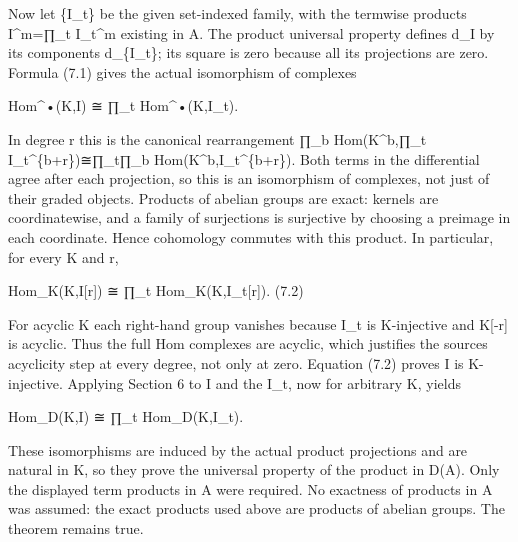 Now let \{I\_\allowbreak{}t\} be the given set-indexed family,\allowbreak{} with the termwise products I\textasciicircum{}m\allowbreak{}=∏\_\allowbreak{}t I\_\allowbreak{}t\textasciicircum{}m existing in A. The product universal property defines d\_\allowbreak{}I by its components d\_\allowbreak{}\{I\_\allowbreak{}t\}; its square is zero because all its projections are zero. Formula (7.1)\allowbreak{} gives the actual isomorphism of complexes

Hom\textasciicircum{}•(K,\allowbreak{}I)\allowbreak{} ≅ ∏\_\allowbreak{}t Hom\textasciicircum{}•(K,\allowbreak{}I\_\allowbreak{}t)\allowbreak{}.

In degree r this is the canonical rearrangement ∏\_\allowbreak{}b Hom(K\textasciicircum{}b,\allowbreak{}∏\_\allowbreak{}t I\_\allowbreak{}t\textasciicircum{}\{b\allowbreak{}+r\})\allowbreak{}≅∏\_\allowbreak{}t∏\_\allowbreak{}b Hom(K\textasciicircum{}b,\allowbreak{}I\_\allowbreak{}t\textasciicircum{}\{b\allowbreak{}+r\})\allowbreak{}. Both terms in the differential agree after each projection,\allowbreak{} so this is an isomorphism of complexes,\allowbreak{} not just of their graded objects. Products of abelian groups are exact:\allowbreak{} kernels are coordinatewise,\allowbreak{} and a family of surjections is surjective by choosing a preimage in each coordinate. Hence cohomology commutes with this product. In particular,\allowbreak{} for every K and r,\allowbreak{}

Hom\_\allowbreak{}K(K,\allowbreak{}I[r]\allowbreak{})\allowbreak{} ≅ ∏\_\allowbreak{}t Hom\_\allowbreak{}K(K,\allowbreak{}I\_\allowbreak{}t[r]\allowbreak{})\allowbreak{}. (7.2)\allowbreak{}

For acyclic K each right-hand group vanishes because I\_\allowbreak{}t is K-injective and K[-r]\allowbreak{} is acyclic. Thus the full Hom complexes are acyclic,\allowbreak{} which justifies the source\textquotesingle s acyclicity step at every degree,\allowbreak{} not only at zero. Equation (7.2)\allowbreak{} proves I is K-injective. Applying Section 6 to I and the I\_\allowbreak{}t,\allowbreak{} now for arbitrary K,\allowbreak{} yields

Hom\_\allowbreak{}D(K,\allowbreak{}I)\allowbreak{} ≅ ∏\_\allowbreak{}t Hom\_\allowbreak{}D(K,\allowbreak{}I\_\allowbreak{}t)\allowbreak{}.

These isomorphisms are induced by the actual product projections and are natural in K,\allowbreak{} so they prove the universal property of the product in D(A)\allowbreak{}. Only the displayed term products in A were required. No exactness of products in A was assumed:\allowbreak{} the exact products used above are products of abelian groups. The theorem remains true.

